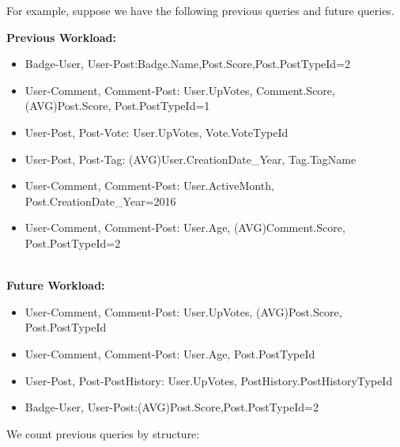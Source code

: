 For example, suppose we have the following previous queries and future queries.

\textbf{Previous Workload:}

\begin{itemize}
\item Badge-User, User-Post:Badge.Name,Post.Score,Post.PostTypeId=2

\item User-Comment, Comment-Post: User.UpVotes, Comment.Score, (AVG)Post.Score, Post.PostTypeId=1

\item User-Post, Post-Vote: User.UpVotes, Vote.VoteTypeId

\item User-Post, Post-Tag: (AVG)User.CreationDate\_Year, Tag.TagName

\item User-Comment, Comment-Post: User.ActiveMonth, Post.CreationDate\_Year=2016

\item User-Comment, Comment-Post: User.Age, (AVG)Comment.Score, Post.PostTypeId=2
\end{itemize}


\\
\textbf{Future Workload:}

\begin{itemize}
\item User-Comment, Comment-Post: User.UpVotes, (AVG)Post.Score, Post.PostTypeId

\item User-Comment, Comment-Post: User.Age, Post.PostTypeId

\item User-Post, Post-PostHistory: User.UpVotes, PostHistory.PostHistoryTypeId

\item Badge-User, User-Post:(AVG)Post.Score,Post.PostTypeId=2
\end{itemize}

\par
We count previous queries by structure:

